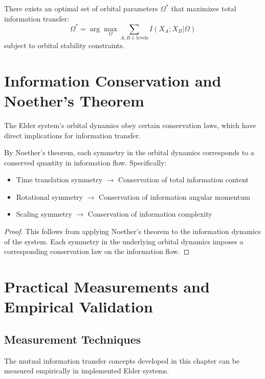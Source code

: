 \begin{theorem}
There exists an optimal set of orbital parameters $\Omega^*$ that maximizes total information transfer:
\begin{equation}
\Omega^* = \arg\max_{\Omega} \sum_{A,B \in \text{levels}} I(X_A; X_B|\Omega)
\end{equation}
subject to orbital stability constraints.
\end{theorem}

\section{Information Conservation and Noether's Theorem}

The Elder system's orbital dynamics obey certain conservation laws, which have direct implications for information transfer.

\begin{theorem}
By Noether's theorem, each symmetry in the orbital dynamics corresponds to a conserved quantity in information flow. Specifically:
\begin{itemize}
    \item Time translation symmetry $\to$ Conservation of total information content
    \item Rotational symmetry $\to$ Conservation of information angular momentum
    \item Scaling symmetry $\to$ Conservation of information complexity
\end{itemize}
\end{theorem}

\begin{proof}
This follows from applying Noether's theorem to the information dynamics of the system. Each symmetry in the underlying orbital dynamics imposes a corresponding conservation law on the information flow.
\end{proof}

\section{Practical Measurements and Empirical Validation}

\subsection{Measurement Techniques}

The mutual information transfer concepts developed in this chapter can be measured empirically in implemented Elder systems.

